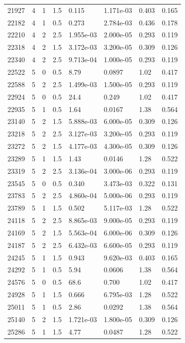 \documentclass[preview]{standalone}
\begin{document}
{{{{{\begin{tabular}{L{1.2cm}C{1.2cm} C{0.3cm}C{0.5cm} C{1.4cm}C{1.4cm} C{1.4cm}C{1.4cm}}
  21927  &     4  & 1     & 1.5 &  0.115  & 1.171e-03  & 0.403 &  0.165   \\ 
  22182  &     4  & 1     & 0.5 &  0.273  & 2.784e-03  & 0.436 &  0.178   \\ 
  22210  &     4  & 2     & 2.5 &  1.955e-03  & 2.000e-05  & 0.293 &  0.119   \\ 
  22318  &     4  & 2     & 1.5 &  3.172e-03  & 3.200e-05  & 0.309 &  0.126   \\ 
  22340  &     4  & 2     & 2.5 &  9.713e-04  & 1.000e-05  & 0.293 &  0.119   \\ 
  22522  &     5  & 0     & 0.5 &  8.79  & 0.0897  & 1.02 &  0.417   \\ 
  22588  &     5  & 2     & 2.5 &  1.499e-03  & 1.500e-05  & 0.293 &  0.119   \\ 
  22924  &     5  & 0     & 0.5 &  24.4  & 0.249  & 1.02 &  0.417   \\ 
  22935  &     5  & 1     & 0.5 &  1.64  & 0.0167  & 1.38 &  0.564   \\ 
  23140  &     5  & 2     & 1.5 &  5.888e-03  & 6.000e-05  & 0.309 &  0.126   \\ 
  23218  &     5  & 2     & 2.5 &  3.127e-03  & 3.200e-05  & 0.293 &  0.119   \\ 
  23272  &     5  & 2     & 1.5 &  4.177e-03  & 4.300e-05  & 0.309 &  0.126   \\ 
  23289  &     5  & 1     & 1.5 &  1.43  & 0.0146  & 1.28 &  0.522   \\ 
  23319  &     5  & 2     & 2.5 &  3.136e-04  & 3.000e-06  & 0.293 &  0.119   \\ 
  23545  &     5  & 0     & 0.5 &  0.340  & 3.473e-03  & 0.322 &  0.131   \\ 
  23783  &     5  & 2     & 2.5 &  4.860e-04  & 5.000e-06  & 0.293 &  0.119   \\ 
  23789  &     5  & 1     & 1.5 &  0.502  & 5.117e-03  & 1.28 &  0.522   \\ 
  24118  &     5  & 2     & 2.5 &  8.865e-03  & 9.000e-05  & 0.293 &  0.119   \\ 
  24169  &     5  & 2     & 1.5 &  5.563e-04  & 6.000e-06  & 0.309 &  0.126   \\ 
  24187  &     5  & 2     & 2.5 &  6.432e-03  & 6.600e-05  & 0.293 &  0.119   \\ 
  24245  &     5  & 1     & 1.5 &  0.943  & 9.620e-03  & 0.403 &  0.165   \\ 
  24292  &     5  & 1     & 0.5 &  5.94  & 0.0606  & 1.38 &  0.564   \\ 
  24576  &     5  & 0     & 0.5 &  68.6  & 0.700  & 1.02 &  0.417   \\ 
  24928  &     5  & 1     & 1.5 &  0.666  & 6.795e-03  & 1.28 &  0.522   \\ 
  25011  &     5  & 1     & 0.5 &  2.86  & 0.0292  & 1.38 &  0.564   \\ 
  25140  &     5  & 2     & 1.5 &  1.721e-03  & 1.800e-05  & 0.309 &  0.126   \\ 
  25286  &     5  & 1     & 1.5 &  4.77  & 0.0487  & 1.28 &  0.522   \\ 
\hline 
\end{tabular} 

}}}}}
\end{document}
